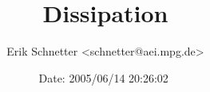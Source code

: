 %
%
%
%


\documentclass{article}

\usepackage{../../../../doc/latex/cactus}



\author{Erik Schnetter \textless schnetter@aei.mpg.de\textgreater}

\title{Dissipation}

\date{$ $Date: 2005/06/14 20:26:02 $ $}

\maketitle



\begin{abstract}
Add fourth order Kreiss-Oliger dissipation to the right hand side of
evolution equations.  This thorn is intended for time evolutions that
use MoL.
\end{abstract}

